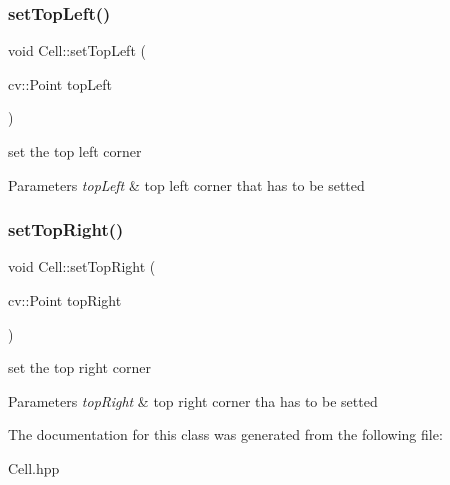\subsubsection{\texorpdfstring{set\+Top\+Left()}{setTopLeft()}}
{\footnotesize\ttfamily void Cell\+::set\+Top\+Left (\begin{DoxyParamCaption}\item[{cv\+::\+Point}]{top\+Left }\end{DoxyParamCaption})}

set the top left corner 
\begin{DoxyParams}{Parameters}
{\em top\+Left} & top left corner that has to be setted \\
\hline
\end{DoxyParams}
\mbox{\label{class_cell_a245afe36e263e2fbf66880e4ea628f40}} 
\subsubsection{\texorpdfstring{set\+Top\+Right()}{setTopRight()}}
{\footnotesize\ttfamily void Cell\+::set\+Top\+Right (\begin{DoxyParamCaption}\item[{cv\+::\+Point}]{top\+Right }\end{DoxyParamCaption})}

set the top right corner 
\begin{DoxyParams}{Parameters}
{\em top\+Right} & top right corner tha has to be setted \\
\hline
\end{DoxyParams}


The documentation for this class was generated from the following file\+:\begin{DoxyCompactItemize}
\item 
Cell.\+hpp\end{DoxyCompactItemize}
